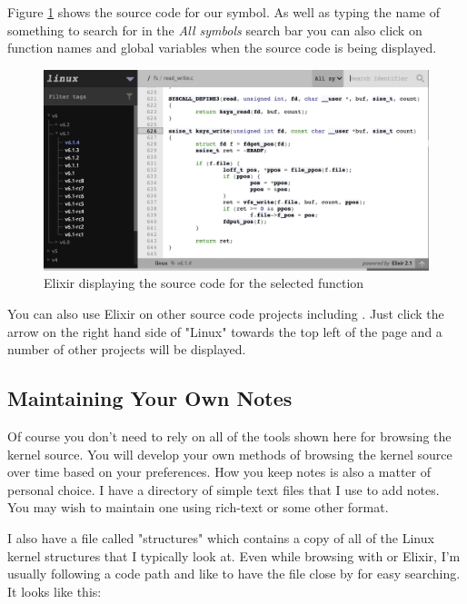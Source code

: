 Figure \ref{fig:elixr-2} shows the source code for our symbol. As well as typing the name of something to search for in the \textit{All symbols} search bar you can also click on function names and global variables when the source code is being displayed.

\begin{figure}
	\includegraphics[scale=0.4]{figures/elixr-2.png}
	\centering
	\caption{Elixir displaying the source code for the selected function}
	\label{fig:elixr-2}
\end{figure}

You can also use Elixir on other source code projects including . Just click the arrow on the right hand side of "Linux" towards the top left of the page and a number of other projects will be displayed.



\subsection{Maintaining Your Own Notes}

Of course you don't need to rely on all of the tools shown here for browsing the kernel source. You will develop your own methods of browsing the kernel source over time based on your preferences. How you keep notes is also a matter of personal choice. I have a directory of simple text files that I use  to add notes. You may wish to maintain one using rich-text or some other format.

I also have a file called "structures" which contains a copy of all of the Linux kernel structures that I typically look at. Even while browsing with  or Elixir, I'm usually following a code path and like to have the file close by for easy searching. It looks like this:

